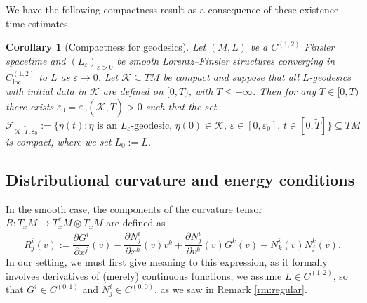 \documentclass[a4paper,11pt]{article}
\numberwithin{equation}{section}
\theoremstyle{definition}
\theoremstyle{plain}
\newtheorem{Corollary}[Definition]{Corollary}
\newcommand{\eps}{\varepsilon}
\newcommand{\loc}{\mathrm{loc}}
\begin{document}
We have the following compactness result as a consequence of these existence time estimates.

\begin{Corollary}[Compactness for geodesics]\label{cr:Fcpt}
Let $(M,L)$ be a $C^{(1,2)}$ Finsler spacetime and $(L_\eps)_{\eps>0}$ be smooth Lorentz--Finsler structures converging in $C^{(1,2)}_{\loc}$ to $L$ as $\eps \to 0$.
Let $\mathcal K \subseteq TM$ be compact and suppose that all $L$-geodesics with initial data in $\mathcal{K}$ are defined on $[0,T)$, with $T \leq +\infty$.
Then for any $\widetilde{T} \in [0,T)$ there exists $\eps_0=\varepsilon_0(\mathcal{K},\widetilde{T}) > 0$ such that the set
\begin{equation*}
    \mathcal{F}_{\mathcal{K}, \widetilde{T}, \varepsilon_0}
    := \bigl\{ \dot{\eta}(t) : \eta \text{ is an } L_{\varepsilon}\text{-geodesic},\, \dot{\eta}(0) \in \mathcal K,\, \varepsilon \in [0,\varepsilon_0],\, t \in [0,\widetilde{T}] \bigr\}
    \subseteq TM
\end{equation*}
is compact, where we set $L_0 := L$.
\end{Corollary}


\subsection{Distributional curvature and energy conditions}
\label{ssc:curvature}

In the smooth case, the components of the curvature tensor $R : T_xM \rightarrow T^*_xM \otimes T_xM$ are defined as
\begin{equation}\label{eq:DistributionalCurvature}
    R^i_j(v) := \frac{\partial G^i}{\partial x^j}(v) - \frac{\partial N^i_j}{\partial x^k}(v)v^k + \frac{\partial N^i_j}{\partial v^k}(v)G^k(v) - N^i_k(v)N^k_j(v).
\end{equation}
In our setting, we must first give meaning to this expression, as it formally involves derivatives of (merely) continuous functions; we assume $L \in C^{(1,2)}$, so that $G^i \in C^{(0,1)}$ and $N^i_j \in C^{(0,0)}$, as we saw in Remark \ref{rm:regular}. 
\end{document}
